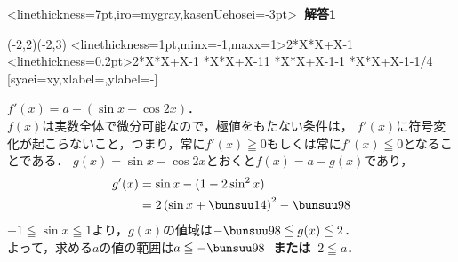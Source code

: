 \documentclass[10pt,
b5paper,
fleqn,
dvipdfmx,
uplatex
]{jsarticle}
\newcommand{\bb}{\bf\boldmath}%
\newcommand{\C}{\text{C}}
\newenvironment{leftbbar}{%
\def\FrameCommand{\color{mygray} \vrule width 5pt \hspace{1zw}
\color{black}}%
\MakeFramed {\advance\hsize-\width \FrameRestore}}%
{\endMakeFramed}
\newenvironment{解答1}{
\hspace{-2zw}\phkasen<linethickness=7pt,iro=mygray,kasenUehosei=-3pt>{\bf \large \ 解答1\ }\vspace{-1zw}\begin{leftbbar}}{\end{leftbbar}}
\begin{document}
{\begin{解答1}
\begin{mawarikomi}{}{
\iffigure
\begin{zahyou}[ul=10mm,yscale=1,xscale=1.5,yokozikukigou=$\sin x$](-2,2)(-2,3)
\def\Fx{2*X*X+X-1}
\YGraph<linethickness=1pt,minx=-1,maxx=1>\Fx
\YGraph<linethickness=0.2pt>\Fx
\YPoint\Fx{1}\A
\YPoint\Fx{-1}\B
\YPoint\Fx{-1/4}\C
\Put\A[syaei=xy]{}
\Put\B[syaei=x]{}
\Put\C[syaei=xy,xlabel=,ylabel=-]{}
\Kuromaru\A
\Kuromaru\B
\Kuromaru\C
\end{zahyou}
\fi
}
$f'(x)=a-(\sin x-\cos 2x)$．\\
$f(x)$は実数全体で微分可能なので，極値をもたない条件は，
$f'(x)$に符号変化が起こらないこと，つまり，常に$f'(x) \geqq 0$もしくは常に$f'(x) \leqq 0$となることである．
$g(x)=\sin x-\cos 2x$とおくと$f(x)=a-g(x)$であり，
\begin{align*}
g'(x)&=\sin x-(1-2\sin^2 x)\\
&=2\left(\sin x +\bunsuu14\right)^2-\bunsuu 98
\end{align*}
$-1\leqq \sin x \leqq 1$より，$g(x)$の値域は$-\bunsuu 98 \leqq g(x) \leqq 2$．\\
よって，求める$a$の値の範囲は{\bb $a \leqq -\bunsuu 98$\ または\ $2\leqq a$}．
\end{mawarikomi}
\end{解答1}

\newpage

}
\end{document}
